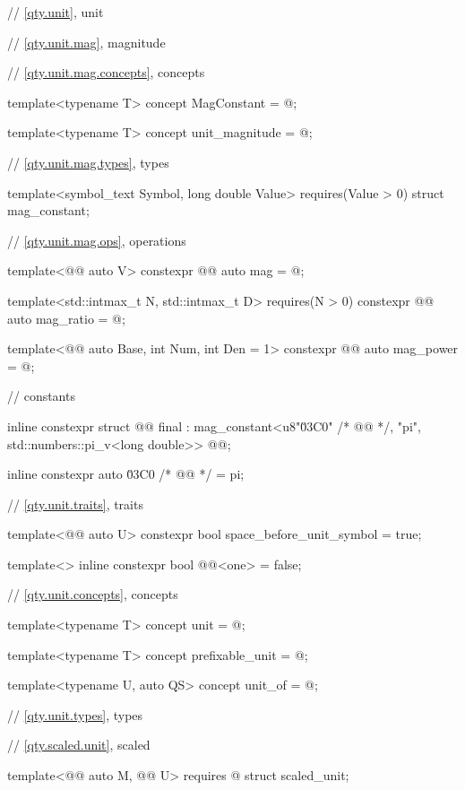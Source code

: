 \begin{codeblock}
{// \ref{qty.unit}, unit

// \ref{qty.unit.mag}, magnitude

// \ref{qty.unit.mag.concepts}, concepts

template<typename T>
concept MagConstant = @\seebelownc@;

template<typename T>
concept unit_magnitude = @\seebelownc@;

// \ref{qty.unit.mag.types}, types

template<symbol_text Symbol, long double Value>
  requires(Value > 0)
struct mag_constant;

// \ref{qty.unit.mag.ops}, operations

template<@@ auto V>
constexpr @@ auto mag = @\seebelownc@;

template<std::intmax_t N, std::intmax_t D>
  requires(N > 0)
constexpr @@ auto mag_ratio = @\seebelownc@;

template<@@ auto Base, int Num, int Den = 1>
constexpr @@ auto mag_power = @\seebelownc@;

// constants

inline constexpr struct @@ final :
    mag_constant<{u8"\u03C0" /* @@ */, "pi"},
                 std::numbers::pi_v<long double>> {
} @@;

inline constexpr auto \u03C0 /* @@ */ = pi;

// \ref{qty.unit.traits}, traits

template<@@ auto U>
constexpr bool space_before_unit_symbol = true;

template<>
inline constexpr bool @@<one> = false;

// \ref{qty.unit.concepts}, concepts

template<typename T>
concept unit = @\seebelownc@;

template<typename T>
concept prefixable_unit = @\seebelownc@;

template<typename U, auto QS>
concept unit_of = @\seebelownc@;

// \ref{qty.unit.types}, types

// \ref{qty.scaled.unit}, scaled

template<@@ auto M, @@ U>
  requires @\seebelownc@
struct scaled_unit;

}
\end{codeblock}

